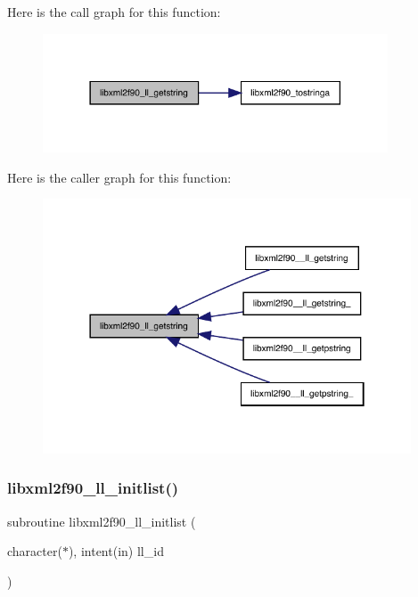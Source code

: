 Here is the call graph for this function\+:
\nopagebreak
\begin{figure}[H]
\begin{center}
\leavevmode
\includegraphics[width=290pt]{libxml2f90_8f90__pp_8f90_adbc34014dab0a252a634da0e15d1ae7d_cgraph}
\end{center}
\end{figure}
Here is the caller graph for this function\+:
\nopagebreak
\begin{figure}[H]
\begin{center}
\leavevmode
\includegraphics[width=310pt]{libxml2f90_8f90__pp_8f90_adbc34014dab0a252a634da0e15d1ae7d_icgraph}
\end{center}
\end{figure}
\mbox{\label{libxml2f90_8f90__pp_8f90_abd1f7aafd23265c8c8ed7934fff5af75}} 
\subsubsection{\texorpdfstring{libxml2f90\+\_\+ll\+\_\+initlist()}{libxml2f90\_ll\_initlist()}}
{\footnotesize\ttfamily subroutine libxml2f90\+\_\+ll\+\_\+initlist (\begin{DoxyParamCaption}\item[{character($\ast$), intent(in)}]{ll\+\_\+id }\end{DoxyParamCaption})}

